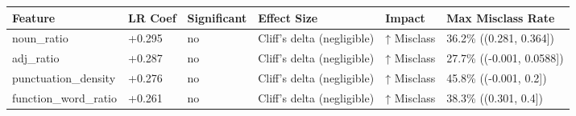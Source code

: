\begin{tabular}{llllll}
\toprule
Feature & LR Coef & Significant & Effect Size & Impact & Max Misclass Rate \\
\midrule
noun\_ratio & +0.295 & no & Cliff's delta (negligible) & ↑ Misclass & 36.2\% ((0.281, 0.364]) \\
adj\_ratio & +0.287 & no & Cliff's delta (negligible) & ↑ Misclass & 27.7\% ((-0.001, 0.0588]) \\
punctuation\_density & +0.276 & no & Cliff's delta (negligible) & ↑ Misclass & 45.8\% ((-0.001, 0.2]) \\
function\_word\_ratio & +0.261 & no & Cliff's delta (negligible) & ↑ Misclass & 38.3\% ((0.301, 0.4]) \\
\bottomrule
\end{tabular}
